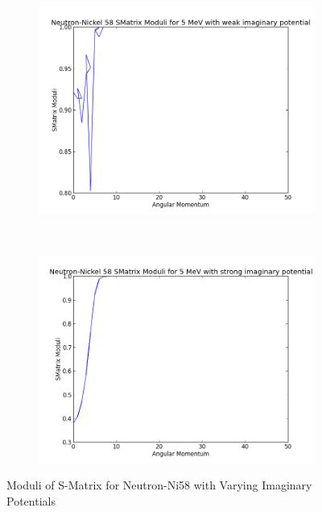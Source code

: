 \documentclass[paper=a4, fontsize=11pt]{scrartcl} %
\numberwithin{equation}{section} %
\numberwithin{figure}{section} %
\numberwithin{table}{section} %
\begin{document}
 \begin{figure}[hbt!]
        \centering
        \begin{subfigure}[b!]{0.35\textwidth}
                \includegraphics[width=\textwidth]{NeutronWeaks.png}
        \end{subfigure}%
        ~ %
\quad
        \begin{subfigure}[b!]{0.35\textwidth}
                \includegraphics[width=\textwidth]{NeutronStrongs.png}
        \end{subfigure}

        \caption{Moduli of S-Matrix for Neutron-Ni58 with Varying Imaginary Potentials}
\end{figure}
\end{document}
